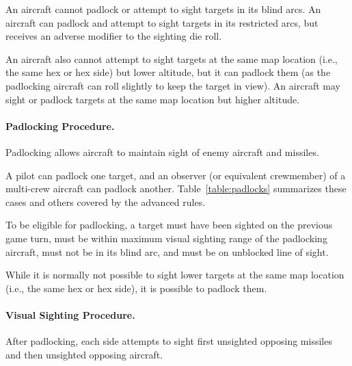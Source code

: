 {An aircraft cannot padlock or attempt to sight targets in its blind arcs. An aircraft can padlock and attempt to sight targets in its restricted arcs, but receives an adverse modifier to the sighting die roll.


An aircraft also cannot attempt to sight targets at the same map location (i.e., the same hex or hex side) but lower altitude, but it can padlock them (as the padlocking aircraft can roll slightly to keep the target in view). An aircraft may sight or padlock targets at the same map location but higher altitude.

\paragraph{Padlocking Procedure.}

Padlocking allows aircraft to maintain sight of enemy aircraft and missiles.

A pilot can padlock one target, and an observer (or equivalent crewmember) of a multi-crew aircraft can padlock another. Table~\ref{table:padlocks} summarizes these cases and others covered by the advanced rules.

To be eligible for padlocking, a target must have been sighted on the previous game turn, must be within maximum visual sighting range of the padlocking aircraft, must not be in its blind arc, and must be on unblocked line of sight.

While it is normally not possible to sight lower targets at the same map location (i.e., the same hex or hex side), it is possible to padlock them.



\paragraph{Visual Sighting Procedure.}

After padlocking, each side attempts to sight first unsighted opposing missiles and then unsighted opposing aircraft.

}
